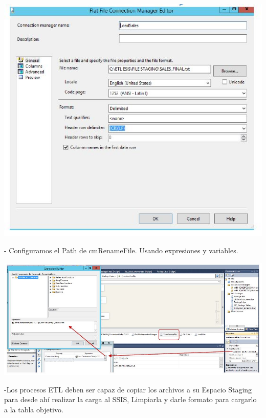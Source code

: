 \begin{itemize}
	\begin{center}
	\includegraphics[width=14cm]{./Imagenes/29}
	\end{center}	

- Configuramos el Path de cmRenameFile. Usando expresiones y variables.

	\begin{center}
	\includegraphics[width=17cm]{./Imagenes/30}
	\end{center}	

-Los procesos ETL deben ser capaz de copiar los archivos a su Espacio Staging para desde ahí realizar la carga al SSIS, Limpiarla y darle formato para cargarlo a la tabla objetivo.
\end{itemize}